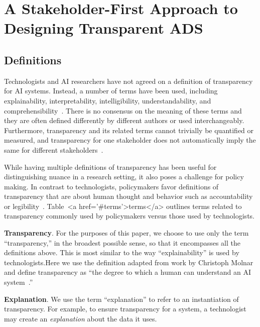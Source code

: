 \section{A Stakeholder-First Approach to Designing Transparent ADS}
\label{sec:explain}

\subsection{Definitions}

Technologists and AI researchers have not agreed on a definition of transparency for AI systems. Instead, a number of terms have been used, including explainability, interpretability, intelligibility, understandability, and comprehensibility~\cite{DBLP:journals/corr/abs-2012-01805}. There is no consensus on the meaning of these terms and they are often defined differently by different authors or used interchangeably. Furthermore, transparency and its related terms cannot trivially be quantified or measured, and transparency for one stakeholder does not automatically imply the same for different stakeholders~\cite{lipton2018mythos, hind2019explaining}.

While having multiple definitions of transparency has been useful for distinguishing nuance in a research setting, it also poses a challenge for policy making. In contrast to technologists, policymakers favor definitions of transparency that are about human thought and behavior such as accountability or legibility~\cite{DBLP:conf/aies/KrafftYKHB20}. Table~<a href='#terms'>terms</a> outlines terms related to transparency commonly used by policymakers versus those used by technologists.

{\bf Transparency}. For the purposes of this paper, we choose to use only the term ``transparency,'' in the broadest possible sense, so that it encompasses all the definitions above. This is most similar to the way ``explainability'' is used by technologists.Here we use the definition adapted from work by Christoph Molnar and define transparency as ``the degree to which a human can understand an AI system~\cite{molnar2019}.'' %

{\bf Explanation}. We use the term ``explanation'' to refer to an instantiation of transparency. For example, to ensure transparency for a system, a technologist may create an \emph{explanation} about the data it uses.

